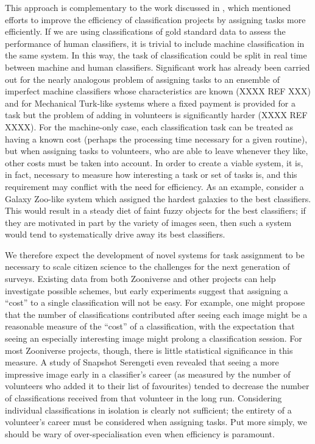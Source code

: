 \documentclass{ar2e}
\begin{document}
This approach is complementary to the work discussed in
, which mentioned efforts to improve the efficiency of
classification projects by assigning tasks more efficiently. If we are using
classifications of gold standard data to assess the performance of human
classifiers, it is trivial to include machine classification in the same system.
In this way, the task of classification could be split in real time between
machine and human classifiers. Significant work has already been carried out for
the nearly analogous problem of assigning tasks to an ensemble of imperfect
machine classifiers whose characteristics are known (XXXX REF XXX) and for
Mechanical Turk-like systems where a fixed payment is provided for a task but
the problem of adding in volunteers is significantly harder (XXXX REF XXXX). For
the machine-only case, each classification task can be treated as having a known
cost (perhaps the processing time necessary for a given routine), but when
assigning tasks to  volunteers, who are able to leave whenever they like, other
costs must be taken into account. In order to create a viable system, it is, in
fact, necessary to measure how interesting a task or set of tasks is, and this
requirement may conflict with the need for efficiency. As an example, consider a
Galaxy Zoo-like system which assigned the hardest galaxies to the best
classifiers. This would result in a steady diet of faint fuzzy objects for the
best classifiers; if they are motivated in part by the variety of images seen,
then such a system would tend to systematically drive away its best
classifiers. 

We therefore expect the development of novel systems for task assignment to be
necessary to scale citizen science to the challenges for the next generation of
surveys. Existing data from both Zooniverse and other projects can help
investigate possible schemes, but early experiments suggest that assigning a
``cost'' to a single classification will not be easy. For example, one might
propose that the number of classifications contributed after seeing each image
might be a reasonable measure of the ``cost'' of a classification, with the
expectation that seeing an especially interesting image might prolong a
classification session. For most Zooniverse projects, though, there is little
statistical significance in this measure. A study of Snapshot Serengeti even
revealed that seeing a more impressive image early in a classifier's career (as
measured by the number of volunteers who added it to their list of favourites)
tended to decrease the number of classifications received from that volunteer in
the long run. Considering individual classifications in isolation is clearly not
sufficient; the entirety of a volunteer's career must be considered when
assigning tasks. Put more simply, we should be wary of over-specialisation even
when efficiency is paramount. 
\end{document}
